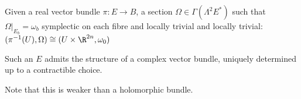 \documentclass[a4paper]{article}
\begin{document}
Given a real vector bundle \(\pi: E \to B\), a section \(\Omega \in \Gamma(\Lambda^2E^*)\) such that \(\Omega|_{E_b} = \omega_b\) symplectic on each fibre and locally trivial and locally trivial: \((\pi^{-1}(U), \Omega) \cong (U \times \R^{2n}, \omega_0)\)

\begin{corollary}
  Such an \(E\) admits the structure of a complex vector bundle, uniquely determined up to a contractible choice.
\end{corollary}

Note that this is weaker than a holomorphic bundle.










\printindex
\end{document}
